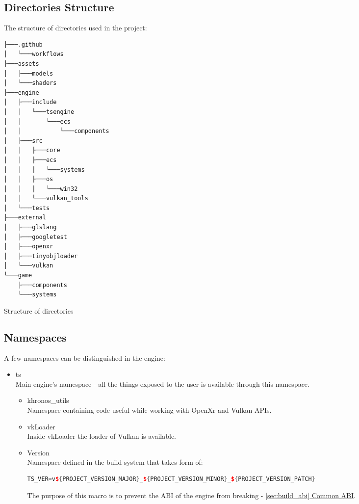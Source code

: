 \newpage
\subsection{Directories Structure}
The structure of directories used in the project:
\begin{verbatim}
├───.github
│   └───workflows
├───assets
│   ├───models
│   └───shaders
├───engine
│   ├───include
│   │   └───tsengine
│   │       └───ecs
│   │           └───components
│   ├───src
│   │   ├───core
│   │   ├───ecs
│   │   │   └───systems
│   │   ├───os
│   │   │   └───win32
│   │   └───vulkan_tools
│   └───tests
├───external
│   ├───glslang
│   ├───googletest
│   ├───openxr
│   ├───tinyobjloader
│   └───vulkan
└───game
    ├───components
    └───systems
\end{verbatim}
\begin{table}[h]
\caption{Structure of directories}
\end{table}

\subsection{Namespaces}
\label{sec:namespaces}
\hspace{\parindent}
A few namespaces can be distinguished in the engine:
\begin{itemize}
    \item ts\\
    Main engine's namespace - all the things exposed to the user is available through this namespace.
    \begin{itemize}
        \item khronos\_utils\\
            Namespace containing code useful while working with OpenXr and Vulkan APIs.
        \item vkLoader\\
            Inside vkLoader the loader of Vulkan is available.
        \item Version\\
            Namespace defined in the build system that takes form of:
\begin{lstlisting}[language=c++, caption= Definition of TS\_VER preprocessor macro (.engine/CMakeLists.txt)]
TS_VER=v${PROJECT_VERSION_MAJOR}_${PROJECT_VERSION_MINOR}_${PROJECT_VERSION_PATCH}
\end{lstlisting}
            The purpose of this macro is to prevent the ABI of the engine from breaking - \hyperref[sec:build_abi]{\ref*{sec:build_abi} Common ABI}.
    \end{itemize}
\end{itemize}